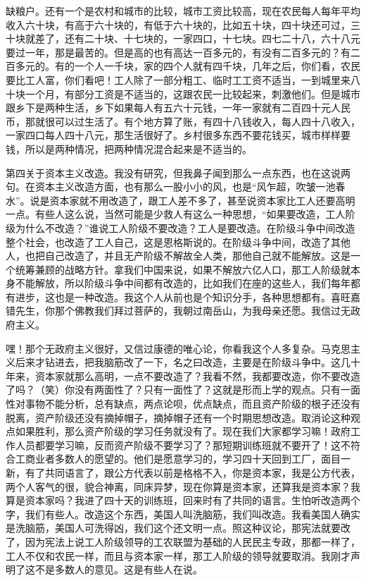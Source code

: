 缺粮户。还有一个是农村和城市的比较，城市工资比较高，现在农民每人每年平均收入六十块，有高于六十块的，有低于六十块的，比如五十块，四十块还可过，三十块就差了，还有二十块、十七块的，一家四口，十七块。四七二十八，六十八元要过一年，那是最苦的。但是高的也有高达一百多元的，有没有二百多元的？有二百多元的。有的一个人一千块，家的四个人就有四千块，几年之后，你们看，农民要比工人富，你们看吧！工人除了一部分粗工、临时工工资不适当，一到城里来八十块一个月，有部分工资是不适当的，这跟农民一比较起来，刺激他们。但是城市跟乡下是两种生活，乡下如果每人有五六十元钱，一年一家就有二百四十元人民币，那就很可以过生活了。有个地方算了账，有四十八钱收入，每人四十八收入，一家四口每人四十八元，那生活很好了。乡村很多东西不要花钱买，城市样样要钱，所以是两种情况，把两种情况混合起来是不适当的。

第四关于资本主义改造。我没有研究，但我鼻子闻到那么一点东西，也在这说两句。在资本主义改造方面，也有那么一股小小的风，也是“风乍超，吹皱一池春水”。说是资本家就不用改造了，跟工人差不多了，甚至说资本家比工人还要高明一点。有些人这么说，当然可能是少救人有这么一种思想，“如果要改造，工人阶级为什么不改造？”谁说工人阶级不要改造？工人是要改造。在阶级斗争中间改造整个社会，也改造了工人自己，这是恩格斯说的。在阶级斗争中间，改造了其他人，也把自己改造了，并且无产阶级不解故全人类，那他自己就不能解放。这是一个统筹兼顾的战略方针。拿我们中国来说，如果不解放六亿人口，那工人阶级就本身不能解放，所以阶级斗争中间都有改造的，比如我们在座的这些人，我们每年都有进步，这也是一种改造。我这个人从前也是个知识分手，各种思想都有。喜旺嘉错先生，你那个佛教我们拜过菩萨的，我朝过南岳山，为我母亲还愿。我信过无政府主义。

嘿！那个无政府主义很好，又信过康德的唯心论，你看我这个人多复杂。马克思主义后来才钻进去，把我脑筋改了一下，名之曰改造，主要是在阶级斗争中。这几十年来，资本家就那么高明，一点不要改造了？我看不然，我都要改造，你不要改造了吗？（笑）你没有两面性了？只有一面性了？这就是形而上学的观点。只有一面性对事物不能分析，总有缺点，两点论呗，优点缺点，而且资产阶级的根子还没有脱离，资产阶级还没有摘掉帽子，摘掉帽子还有一个时期思想改造。取消论这种观点如果胜利，那么资产阶级的学习任务就没有了。现在我们大家都学习嘛！政府工作人员都要学习嘛，反而资产阶级不要学习了？那短期训练班就不要开了！这不符合工商业者多数人的愿望的。他们是愿意学习的，学习四十天回到工厂，面目一新，有了共同语言了，跟公方代表以前是格格不入，你是资本家，我是公方代表，两个人客气的很，貌合神离，同床异梦，现在你算是资本家，还算我是资本家？我算是资本家吗？我进了四十天的训练班，回来时有了共同的语言。生怕听改造两个字，我们有些人。改造这个东西，美国人叫洗脑筋，我们叫改造。我看美国人确实是洗脑筋，美国人可洗得凶，我们这个还文明一点。照这种议论，那宪法就要改了，因为宪法上说工人阶级领导的工农联盟为基础的人民民主专政，那都一样了，工人不仅和农民一样，而且与资本家一样，那工人阶级的领导就要取消。我刚才声明了这不是多数人的意见。这是有些人在说。

